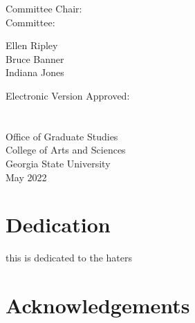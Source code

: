 \documentclass[12pt]{report}
\begin{document}
  \hspace{0.33\textwidth}
  \begin{minipage}[t]{0.33\textwidth}
  Committee Chair:\\
  Committee: \\
  \end{minipage}%
  \begin{minipage}[t]{0.33\textwidth}
  \begin{flushright}
  Ellen Ripley \\
  Bruce Banner \\
  Indiana Jones \\
  \end{flushright}
  \end{minipage}%
  \vspace{1cm}

  \parbox[b]{\textwidth}{
  Electronic Version Approved:\\\\\\
  Office of Graduate Studies\\
  College of Arts and Sciences\\
  Georgia State University\\
  May 2022
  }



\thispagestyle{empty}
\setlength{\abovedisplayskip}{-5pt}
\setlength{\abovedisplayshortskip}{-5pt}




\hypertarget{dedication}{%
\chapter*{Dedication}\label{dedication}}


this is dedicated to the haters

\setcounter{page}{4}
\pagestyle{fancy}


\hypertarget{acknowledgements}{%
\chapter*{Acknowledgements}\label{acknowledgements}}
\end{document}
